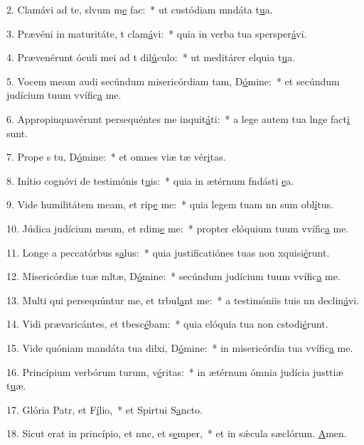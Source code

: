 2. Clamávi ad te, slvum m\uline{e} fac:~* ut custódiam mndáta t\uline{u}a.\par 
3. Prævéni in maturitáte, t clam\uline{á}vi:~* quia in verba tua spersper\uline{á}vi.\par 
4. Prævenérunt óculi mei ad t dil\uline{ú}culo:~* ut meditárer elquia t\uline{u}a.\par 
5. Vocem meam audi secúndum misericórdiam tam, D\uline{ó}mine:~* et secúndum judícium tuum vvífic\uline{a} me.\par 
6. Appropinquavérunt persequéntes me inquit\uline{á}ti:~* a lege autem tua lnge fact\uline{i} sunt.\par 
7. Prope s tu, D\uline{ó}mine:~* et omnes viæ tæ vér\uline{i}tas.\par 
8. Inítio cognóvi de testimónis t\uline{u}is:~* quia in ætérnum fndásti \uline{e}a.\par 
9. Vide humilitátem meam, et rip\uline{e} me:~* quia legem tuam nn sum obl\uline{í}tus.\par 
10. Júdica judícium meum, et rdim\uline{e} me:~* propter elóquium tuum vvífic\uline{a} me.\par 
11. Longe a peccatórbus s\uline{a}lus:~* quia justificatiónes tuas non xquisi\uline{é}runt.\par 
12. Misericórdiæ tuæ mltæ, D\uline{ó}mine:~* secúndum judícium tuum vvífic\uline{a} me.\par 
13. Multi qui persequúntur me, et trbul\uline{a}nt me:~* a testimóniis tuis nn declin\uline{á}vi.\par 
14. Vidi prævaricántes, et tbesc\uline{é}bam:~* quia elóquia tua non cstodi\uline{é}runt.\par 
15. Vide quóniam mandáta tua dilxi, D\uline{ó}mine:~* in misericórdia tua vvífic\uline{a} me.\par 
16. Princípium verbórum turum, v\uline{é}ritas:~* in ætérnum ómnia judícia justtiæ t\uline{u}æ.\par 
17. Glória Patr, et F\uline{í}lio,~* et Spirtui S\uline{a}ncto.\par 
18. Sicut erat in princípio, et nnc, et s\uline{e}mper,~* et in sǽcula sæclórum. \uline{A}men.\par 
